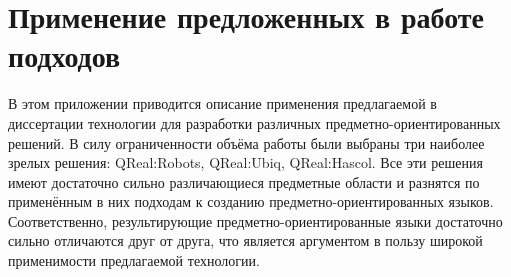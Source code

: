 \appendix

\chapter{Применение предложенных в работе подходов} \label{appendixA}

В этом приложении приводится описание применения предлагаемой в диссертации технологии 
для разработки различных предметно-ориентированных решений. В силу ограниченности 
объёма работы были выбраны три наиболее зрелых решения: QReal:Robots, QReal:Ubiq,
QReal:Hascol. Все эти решения имеют достаточно сильно различающиеся предметные области 
и разнятся по применённым в них подходам к созданию предметно-ориентированных языков. 
Соответственно, результирующие предметно-ориентированные языки достаточно сильно отличаются 
друг от друга, что является аргументом в пользу широкой применимости предлагаемой технологии.



